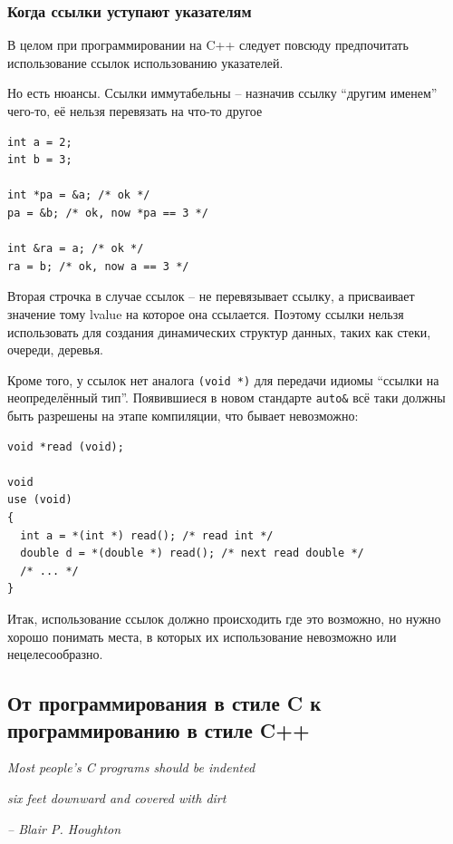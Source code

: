 \documentclass[a4paper,12pt,oneside]{article}
\begin{document}
\subsubsection{Когда ссылки уступают указателям}\label{PointersVsRefs}

В целом при программировании на C++ следует повсюду предпочитать использование ссылок использованию указателей.

Но есть нюансы. Ссылки иммутабельны -- назначив ссылку ``другим именем'' чего-то, её нельзя перевязать на что-то другое

\begin{lstlisting}
int a = 2;
int b = 3;

int *pa = &a; /* ok */
pa = &b; /* ok, now *pa == 3 */

int &ra = a; /* ok */
ra = b; /* ok, now a == 3 */
\end{lstlisting}

Вторая строчка в случае ссылок -- не перевязывает ссылку, а присваивает значение тому lvalue на которое она ссылается. Поэтому ссылки нельзя использовать для создания динамических структур данных, таких как стеки, очереди, деревья.

Кроме того, у ссылок нет аналога \lstinline!(void *)! для передачи идиомы ``ссылки на неопределённый тип''. Появившиеся в новом стандарте \lstinline!auto&! всё таки должны быть разрешены на этапе компиляции, что бывает невозможно:

\begin{lstlisting}
void *read (void);

void 
use (void)
{
  int a = *(int *) read(); /* read int */
  double d = *(double *) read(); /* next read double */
  /* ... */
}
\end{lstlisting}

Итак, использование ссылок должно происходить где это возможно, но нужно хорошо понимать места, в которых их использование невозможно или нецелесообразно.

\pagebreak
\subsection{От программирования в стиле C к программированию в стиле C++}

\hfill\textit{Most people's C programs should be indented}

\hfill\textit{six feet downward and covered with dirt}{\vspace{0.5em}}

\hfill\textit{-- Blair P. Houghton}
\end{document}
